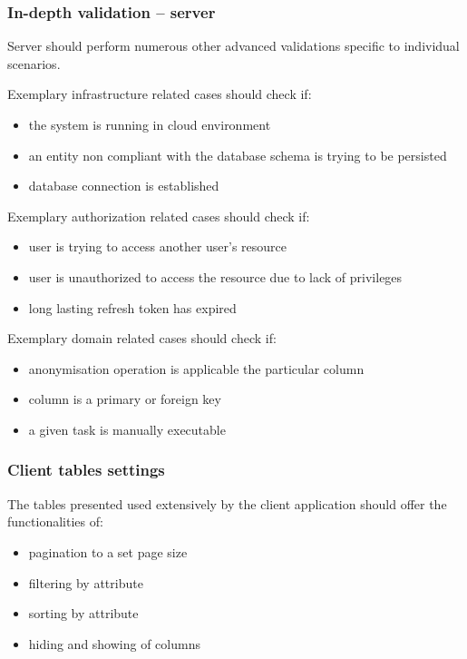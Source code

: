\documentclass[a4paper,twoside,12pt]{book}
\begin{document}
\subsubsection{In-depth validation – server}

Server should perform numerous other advanced validations specific to individual scenarios.

Exemplary infrastructure related cases should check if:
\begin{itemize}
\item the system is running in cloud environment
\item an entity non compliant with the database schema is trying to be persisted
\item database connection is established
\end{itemize}

Exemplary authorization related cases should check if:
\begin{itemize}
\item user is trying to access another user's resource
\item user is unauthorized to access the resource due to lack of privileges
\item long lasting refresh token has expired
\end{itemize}

Exemplary domain related cases should check if:
\begin{itemize}
\item anonymisation operation is applicable the particular column
\item column is a primary or foreign key
\item a given task is manually executable
\end{itemize}

\subsubsection{Client tables settings}
The tables presented used extensively by the client application should offer the functionalities of:

\begin{itemize}
\item pagination to a set page size
\item filtering by attribute
\item sorting by attribute
\item hiding and showing of columns
\end{itemize}
\end{document}
